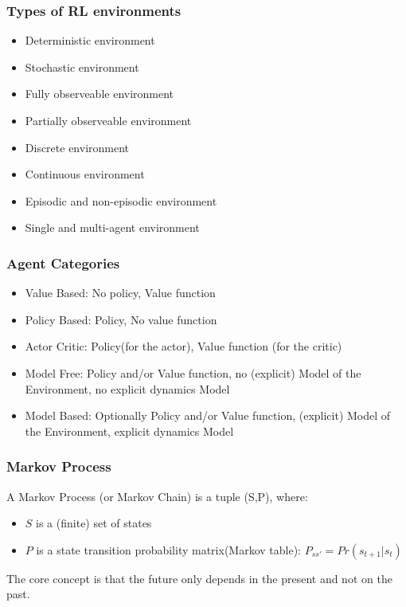 \subsubsection{Types of RL environments}
\begin{itemize}
    \item Deterministic environment
    \item Stochastic environment
    \item Fully observeable environment
    \item Partially observeable environment
    \item Discrete environment
    \item Continuous environment
    \item Episodic and non-episodic environment
    \item Single and multi-agent environment
\end{itemize}
\subsubsection{Agent Categories}
\begin{itemize}
    \item Value Based: No policy, Value function
    \item Policy Based: Policy, No value function
    \item Actor Critic: Policy(for the actor), Value function (for the critic)
    \item Model Free: Policy and/or Value function, no (explicit) Model of the Environment, no explicit dynamics Model
    \item Model Based: Optionally Policy and/or Value function, (explicit) Model of the Environment, explicit dynamics Model
\end{itemize}
\subsubsection{Markov Process}
A Markov Process (or Markov Chain) is a tuple (S,P), where:
\begin{itemize}
    \item \(S\) is a (finite) set of states
    \item \(P\) is a state transition probability matrix(Markov table): \(P_{ss'} = Pr(s_{t+1}|s_t)\)
\end{itemize}
The core concept is that the future only depends in the present and not on the past.
